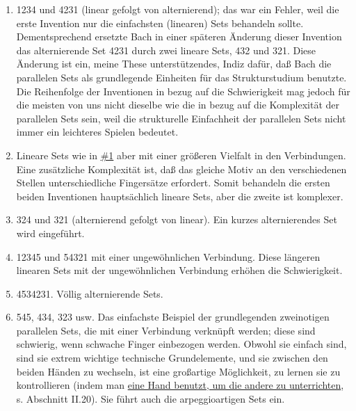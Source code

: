 \begin{enumerate}[label={\arabic*.}] 

\item \label{c1iii20ps01}

1234 und 4231 (linear gefolgt von alternierend); das war ein Fehler, weil die erste Invention nur die einfachsten (linearen) Sets behandeln sollte.
Dementsprechend ersetzte Bach in einer späteren Änderung dieser Invention das alternierende Set 4231 durch zwei lineare Sets, 432 und 321.
Diese Änderung ist ein, meine These unterstützendes, Indiz dafür, daß Bach die parallelen Sets als grundlegende Einheiten für das Strukturstudium benutzte.
Die Reihenfolge der Inventionen in bezug auf die Schwierigkeit mag jedoch für die meisten von uns nicht dieselbe wie die in bezug auf die Komplexität der parallelen Sets sein, weil die strukturelle Einfachheit der parallelen Sets nicht immer ein leichteres Spielen bedeutet.


\item \label{c1iii20ps02}

Lineare Sets wie in \hyperref[c1iii20ps01]{\#1} aber mit einer größeren Vielfalt in den Verbindungen.
Eine zusätzliche Komplexität ist, daß das gleiche Motiv an den verschiedenen Stellen unterschiedliche Fingersätze erfordert.
Somit behandeln die ersten beiden Inventionen hauptsächlich lineare Sets, aber die zweite ist komplexer.


\item \label{c1iii20ps03}

324 und 321 (alternierend gefolgt von linear).
Ein kurzes alternierendes Set wird eingeführt.


\item \label{c1iii20ps04}

12345 und 54321 mit einer ungewöhnlichen Verbindung.
Diese längeren linearen Sets mit der ungewöhnlichen Verbindung erhöhen die Schwierigkeit.


\item \label{c1iii20ps05}

4534231.
Völlig alternierende Sets.


\item \label{c1iii20ps06}

545, 434, 323 usw.
Das einfachste Beispiel der grundlegenden zweinotigen parallelen Sets, die mit einer Verbindung verknüpft werden; diese sind schwierig, wenn schwache Finger einbezogen werden.
Obwohl sie einfach sind, sind sie extrem wichtige technische Grundelemente, und sie zwischen den beiden Händen zu wechseln, ist eine großartige Möglichkeit, zu lernen sie zu kontrollieren (indem man \hyperref[c1ii20]{eine Hand benutzt, um die andere zu unterrichten}, s. Abschnitt II.20).
Sie führt auch die arpeggioartigen Sets ein.



\end{enumerate}
